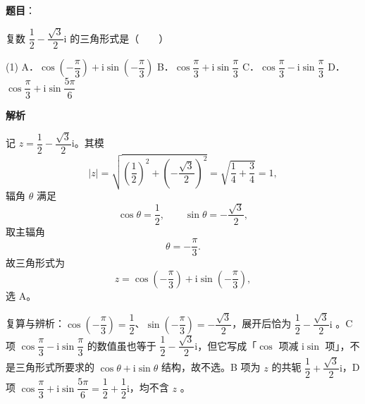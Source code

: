 \begin{answer}

\textbf{题目}：

复数 $\dfrac12-\dfrac{\sqrt3}{2}\mathrm i$ 的三角形式是\mbox{（　　）}

\begin{gkopts}(1)
\task A．$\cos\left(-\dfrac{\pi}{3}\right)+\mathrm i\sin\left(-\dfrac{\pi}{3}\right)$
\task B．$\cos\dfrac{\pi}{3}+\mathrm i\sin\dfrac{\pi}{3}$
\task C．$\cos\dfrac{\pi}{3}-\mathrm i\sin\dfrac{\pi}{3}$
\task D．$\cos\dfrac{\pi}{3}+\mathrm i\sin\dfrac{5\pi}{6}$
\end{gkopts}

\textbf{解析}

记 $z=\dfrac12-\dfrac{\sqrt3}{2}\mathrm i$。其模
\nopagebreak[4]
\[
|z|=\sqrt{\left(\frac12\right)^2+\left(-\frac{\sqrt3}{2}\right)^2}=\sqrt{\frac14+\frac34}=1,
\]
辐角 $\theta$ 满足
\nopagebreak[4]
\[
\cos\theta=\frac12,\qquad \sin\theta=-\frac{\sqrt3}{2},
\]
取主辐角
\nopagebreak[4]
\[
\theta=-\frac{\pi}{3}.
\]
故三角形式为
\nopagebreak[4]
\[
z=\cos\left(-\frac{\pi}{3}\right)+\mathrm i\sin\left(-\frac{\pi}{3}\right),
\]
选 A。

复算与辨析：$\cos\left(-\dfrac{\pi}{3}\right)=\dfrac12$、$\sin\left(-\dfrac{\pi}{3}\right)=-\dfrac{\sqrt3}{2}$，展开后恰为 $\dfrac12-\dfrac{\sqrt3}{2}\mathrm i$ 。C 项 $\cos\dfrac{\pi}{3}-\mathrm i\sin\dfrac{\pi}{3}$ 的数值虽也等于 $\dfrac12-\dfrac{\sqrt3}{2}\mathrm i$，但它写成「$\cos$ 项减 $\mathrm i\sin$ 项」，不是三角形式所要求的 $\cos\theta+\mathrm i\sin\theta$ 结构，故不选。B 项为 $z$ 的共轭 $\dfrac12+\dfrac{\sqrt3}{2}\mathrm i$，D 项 $\cos\dfrac{\pi}{3}+\mathrm i\sin\dfrac{5\pi}{6}=\dfrac12+\dfrac12\mathrm i$，均不含 $z$ 。


\end{answer}
